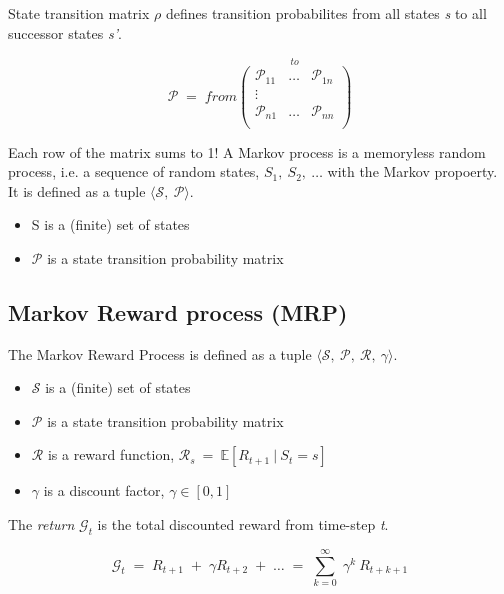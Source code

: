 \documentclass[10pt]{article}
\begin{document}
State transition matrix $\rho$ defines transition probabilites from all states \textit{s} to all successor states \textit{s'}.

\begin{equation}
\mathcal{P} \; = \; from 
\stackrel{\mbox{$to$}}{\begin{pmatrix}
\mathcal{P}_{11} & \ldots & \mathcal{P}_{1n} \\
\vdots & & \\
\mathcal{P}_{n1} & \ldots & \mathcal{P}_{nn} \\
\end{pmatrix}}
\end{equation}

Each row of the matrix sums to 1! \newline
A Markov process is a memoryless random process, i.e. a sequence of random states, $S_{1}, \: S_{2}, \: \ldots$ with the Markov propoerty. It is defined as a tuple $\langle \mathcal{S}, \: \mathcal{P} \rangle$.
\begin{itemize}
\item S is a (finite) set of states
\item $\mathcal{P}$ is a state transition probability matrix
\end{itemize}

\subsection{Markov Reward process (MRP)}

The Markov Reward Process is defined as a tuple $\langle \mathcal{S}, \: \mathcal{P}, \: \mathcal{R}, \: \gamma \rangle$.
\begin{itemize}
\item $\mathcal{S}$ is a (finite) set of states
\item $\mathcal{P}$ is a state transition probability matrix
\item $\mathcal{R}$ is a reward function, $\mathcal{R}_{s} \: = \: \mathbb{E}[R_{t+1} \: | \: S_{t} = s]$
\item $\gamma$ is a discount factor, $\gamma \in [0,1]$
\end{itemize}

The \textit{return} $\mathcal{G}_{t}$ is the total discounted reward from time-step \textit{t}.

\begin{equation}
\mathcal{G}_{t} \; = \; R_{t+1} \; + \; \gamma R_{t+2} \; + \; \ldots \; = \;  \sum_{k=0}^{\infty} \;\gamma^{k} \: R_{t+k+1} 
\label{eq:g_t}
\end{equation}
\end{document}
